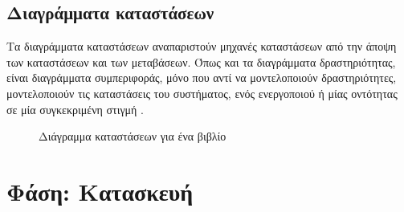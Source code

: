\documentclass{assignment}
\begin{document}
\subsection{Διαγράμματα καταστάσεων}

Τα διαγράμματα καταστάσεων αναπαριστούν μηχανές καταστάσεων από την άποψη των καταστάσεων και των μεταβάσεων. Όπως και τα διαγράμματα δραστηριότητας, είναι διαγράμματα συμπεριφοράς, μόνο που αντί να μοντελοποιούν δραστηριότητες, μοντελοποιούν τις καταστάσεις του συστήματος, ενός ενεργοποιού ή μίας οντότητας σε μία συγκεκριμένη στιγμή \cite{virvou_uml,wazlawick2014object}.

\begin{figure}
\begin{center}
\caption{Διάγραμμα καταστάσεων για ένα βιβλίο}
\label{fig:statechart_diagram_book}
\end{center}
\end{figure}


\section{Φάση: Κατασκευή}


\end{document}
